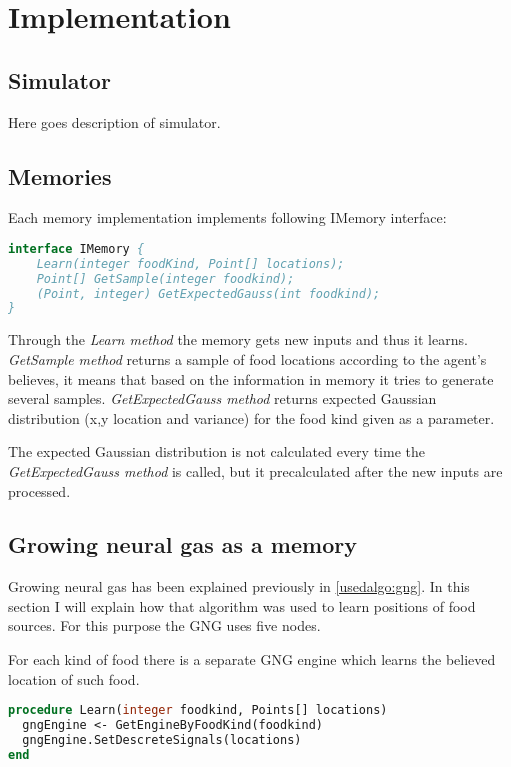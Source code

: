 \chapter{Implementation}

\section{Simulator}

Here goes description of simulator.

\section{Memories}

Each memory implementation implements following IMemory interface:

\begin{lstlisting}[language=Pascal]
interface IMemory {
	Learn(integer foodKind, Point[] locations);
	Point[] GetSample(integer foodkind);	
	(Point, integer) GetExpectedGauss(int foodkind);
}
\end{lstlisting}  

Through the \emph{Learn method} the memory gets new inputs and thus it learns. \emph{GetSample method} returns a sample of food locations according to the agent's believes, it means that based on the information in memory it tries to generate several samples. \emph{GetExpectedGauss method} returns expected Gaussian distribution (x,y location and variance) for the food kind given as a parameter.    

The expected Gaussian distribution is not calculated every time the \emph{GetExpectedGauss method} is called, but it precalculated after the new inputs are processed.

\section{Growing neural gas as a memory}

Growing neural gas has been explained previously in \ref{usedalgo:gng}. In this section I will explain how that algorithm was used to learn positions of food sources. For this purpose the GNG uses five nodes.

For each kind of food there is a separate GNG engine which learns the believed location of such food. 

\begin{lstlisting}[language=Pascal]
procedure Learn(integer foodkind, Points[] locations)
  gngEngine <- GetEngineByFoodKind(foodkind)
  gngEngine.SetDescreteSignals(locations)
end
\end{lstlisting}  

